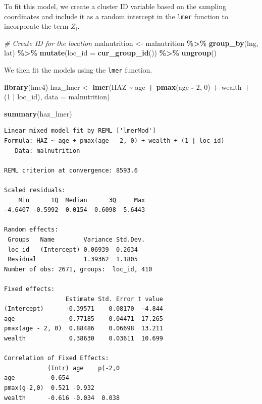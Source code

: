 \documentclass[
  letterpaper,
]{krantz}
\newenvironment{Shaded}{\begin{snugshade}}{\end{snugshade}}
\newcommand{\AttributeTok}[1]{\textcolor[rgb]{0.13,0.29,0.53}{#1}}
\newcommand{\CommentTok}[1]{\textcolor[rgb]{0.56,0.35,0.01}{\textit{#1}}}
\newcommand{\DecValTok}[1]{\textcolor[rgb]{0.00,0.00,0.81}{#1}}
\newcommand{\FunctionTok}[1]{\textcolor[rgb]{0.13,0.29,0.53}{\textbf{#1}}}
\newcommand{\NormalTok}[1]{#1}
\newcommand{\OtherTok}[1]{\textcolor[rgb]{0.56,0.35,0.01}{#1}}
\newcommand{\SpecialCharTok}[1]{\textcolor[rgb]{0.81,0.36,0.00}{\textbf{#1}}}
\begin{document}
To fit this model, we create a cluster ID variable based on the sampling
coordinates and include it as a random intercept in the \texttt{lmer}
function to incorporate the term \(Z_i\).

\begin{Shaded}
\begin{Highlighting}[]
\CommentTok{\# Create ID for the location}
\NormalTok{malnutrition }\OtherTok{\textless{}{-}}\NormalTok{ malnutrition }\SpecialCharTok{\%\textgreater{}\%}
  \FunctionTok{group\_by}\NormalTok{(lng, lat) }\SpecialCharTok{\%\textgreater{}\%}
  \FunctionTok{mutate}\NormalTok{(}\AttributeTok{loc\_id =} \FunctionTok{cur\_group\_id}\NormalTok{()) }\SpecialCharTok{\%\textgreater{}\%}
  \FunctionTok{ungroup}\NormalTok{()}
\end{Highlighting}
\end{Shaded}

We then fit the models using the \texttt{lmer} function.

\begin{Shaded}
\begin{Highlighting}[]
\FunctionTok{library}\NormalTok{(lme4)}
\NormalTok{haz\_lmer }\OtherTok{\textless{}{-}} 
\FunctionTok{lmer}\NormalTok{(HAZ }\SpecialCharTok{\textasciitilde{}}\NormalTok{ age }\SpecialCharTok{+} \FunctionTok{pmax}\NormalTok{(age }\SpecialCharTok{{-}} \DecValTok{2}\NormalTok{, }\DecValTok{0}\NormalTok{) }\SpecialCharTok{+}\NormalTok{ wealth }\SpecialCharTok{+}\NormalTok{ (}\DecValTok{1} \SpecialCharTok{|}\NormalTok{ loc\_id), }\AttributeTok{data =}\NormalTok{ malnutrition)}

\FunctionTok{summary}\NormalTok{(haz\_lmer)}
\end{Highlighting}
\end{Shaded}

\begin{verbatim}
Linear mixed model fit by REML ['lmerMod']
Formula: HAZ ~ age + pmax(age - 2, 0) + wealth + (1 | loc_id)
   Data: malnutrition

REML criterion at convergence: 8593.6

Scaled residuals: 
    Min      1Q  Median      3Q     Max 
-4.6407 -0.5992  0.0154  0.6098  5.6443 

Random effects:
 Groups   Name        Variance Std.Dev.
 loc_id   (Intercept) 0.06939  0.2634  
 Residual             1.39362  1.1805  
Number of obs: 2671, groups:  loc_id, 410

Fixed effects:
                 Estimate Std. Error t value
(Intercept)      -0.39571    0.08170  -4.844
age              -0.77185    0.04471 -17.265
pmax(age - 2, 0)  0.88486    0.06698  13.211
wealth            0.38630    0.03611  10.699

Correlation of Fixed Effects:
            (Intr) age    p(-2,0
age         -0.654              
pmax(g-2,0)  0.521 -0.932       
wealth      -0.616 -0.034  0.038
\end{verbatim}
\end{document}

